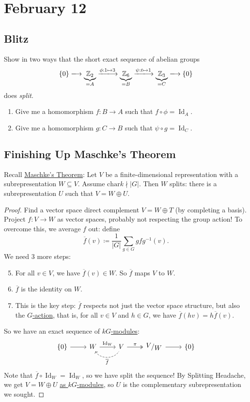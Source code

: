 \documentclass[12pt]{article}
\newcommand{\z}{\mathbb{Z}}
\newcommand{\ita}[1]{\textit{#1}}
\newcommand\inv[1]{#1^{-1}}
\newcommand{\quotient}[2]{{\makebox[\width-2.3pt][l]{\raisebox{.2em}{$#1$}}\left/\raisebox{-.2em}{$#2$}\right.}}
\theoremstyle{definition}
\DeclareMathOperator\Id{Id}
\begin{document}
\section{February 12}
\subsection{Blitz}
Show in two ways that the short exact sequence of abelian groups
\[\{0\}\xlongrightarrow{}\underbrace{\z_2}_{=A}\xlongrightarrow{\phi:1\mapsto3}\underbrace{\z_6}_{=B}\xlongrightarrow{\psi:t\mapsto1}\underbrace{\z_3}_{=C}\xlongrightarrow{}\{0\}\]
does \ita{split}.
\begin{enumerate}
    \item Give me a homomorphism $f:B\to A$ such that $f\circ\phi=\Id_A$.
    \item Give me a homomorphism $g:C\to B$ such that $\psi\circ g=\Id_C$.
\end{enumerate}
\subsection{Finishing Up Maschke's Theorem}
Recall \underline{Maschke's Theorem}: Let $V$ be a finite-dimensional representation with a subrepresentation $W\subseteq V$. Assume $\mathrm{char}k\nmid|G|$. Then $W$ splits: there is a subrepresentation $U$ such that $V=W\oplus U$.
\begin{proof}
    Find a vector space direct complement $V=W\oplus T$ (by completing a basis). Project $f:V\to W$ as vector spaces, probably not respecting the group action! To overcome this, we average $f$ out: define
    \begin{equation}
        \overline{f}(v)\coloneqq \frac{1}{|G|}\sum\limits_{g\in G}gf\inv{g}(v).
    \end{equation}
    We need 3 more steps:
    \begin{enumerate}
        \setcounter{enumi}{4}
        \item For all $v\in V$, we have $\overline{f}(v)\in W$. So $\overline{f}$ maps $V$ to $W$.
        \item $\overline{f}$ is the identity on $W$.
        \item This is the key step: $\overline{f}$ respects not just the vector space structure, but also the \underline{$G$-action}, that is, for all $v\in V$ and $h\in G$, we have $\overline{f}(hv)=h\overline{f}(v)$.
    \end{enumerate}
    So we have an exact sequence of \underline{$kG$-modules}:
    \begin{equation}
        \begin{tikzcd}
            \{0\}\arrow[r] & W\arrow[r,"\Id_W"]\arrow[r,dashleftarrow, "\overline{f}"', bend right=60]  & V\arrow[r,"\pi",twoheadrightarrow] & \quotient{V}{W}\arrow[r] & \{0\}
        \end{tikzcd}
    \end{equation}
    Note that $\overline{f}\circ\Id_W=\Id_W$, so we have split the sequence! By Splitting Headache, we get $V=W\oplus U$ \underline{as $kG$-modules}, so $U$ is the complementary subrepresentation we sought.
\end{proof}
\end{document}
